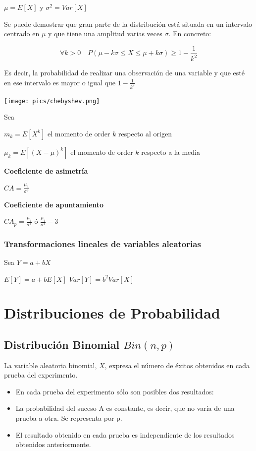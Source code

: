 \documentclass[]{article}
\numberwithin{equation}{section}
\begin{document}
\(\mu=E[X]\) y \(\sigma^2 = Var[X]\)

Se puede demostrar que gran parte de la distribución está situada en un
intervalo centrado en \(\mu\) y que tiene una amplitud varias veces
\(\sigma\). En concreto:

\[
\forall k>0 \quad P(\mu - k \sigma \leq X \leq \mu + k \sigma) \geq 1-\frac{1}{k^2}
\]

Es decir, la probabilidad de realizar una observación de una variable y
que esté en ese intervalo es mayor o igual que \(1-\frac{1}{k^2}\)

\texttt{[image: pics/chebyshev.png]}

Sea

\(m_k = E[X^k]\) el momento de order \(k\) respecto al origen

\(\mu_k = E[(X-\mu)^k]\) el momento de order \(k\) respecto a la media

\textbf{Coeficiente de asimetría}

\(CA = \frac{\mu_3}{\sigma^3}\)

\textbf{Coeficiente de apuntamiento}

\(CA_p = \frac{\mu_4}{\sigma^4}\) ó \(\frac{\mu_4}{\sigma^4}-3\)

\subsubsection{Transformaciones lineales de variables
aleatorias}\label{transformaciones-lineales-de-variables-aleatorias}

Sea \(Y = a + bX\)

\(E[Y] = a + b E[X]\) \(Var[Y] = b^2 Var[X]\)

\section{Distribuciones de
Probabilidad}\label{distribuciones-de-probabilidad}

\subsection{\texorpdfstring{Distribución Binomial
\(Bin(n,p)\)}{Distribución Binomial Bin(n,p)}}\label{distribucion-binomial-binnp}

La variable aleatoria binomial, \(X\), expresa el número de éxitos
obtenidos en cada prueba del experimento.

\begin{itemize}
\item
  En cada prueba del experimento sólo son posibles dos resultados:
\item
  La probabilidad del suceso A es constante, es decir, que no varía de
  una prueba a otra. Se representa por p.
\item
  El resultado obtenido en cada prueba es independiente de los
  resultados obtenidos anteriormente.
\end{itemize}
\end{document}
